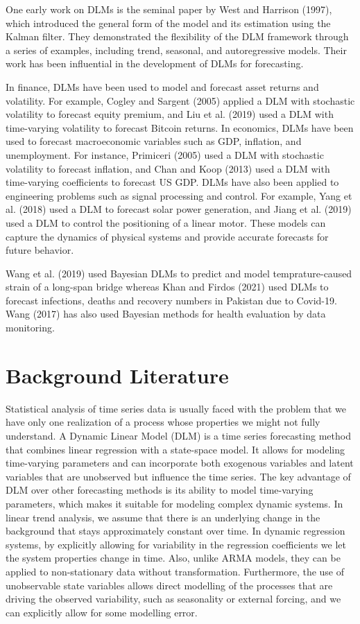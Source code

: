 \documentclass[a4paper,12pt]{article}
\begin{document}
One early work on DLMs is the seminal paper by West and Harrison (1997), which introduced the general form of the model and its estimation using the Kalman filter. They demonstrated the flexibility of the DLM framework through a series of examples, including trend, seasonal, and autoregressive models. Their work has been influential in the development of DLMs for forecasting.

In finance, DLMs have been used to model and forecast asset returns and volatility. For example, Cogley and Sargent (2005) applied a DLM with stochastic volatility to forecast equity premium, and Liu et al. (2019) used a DLM with time-varying volatility to forecast Bitcoin returns. In economics, DLMs have been used to forecast macroeconomic variables such as GDP, inflation, and unemployment. For instance, Primiceri (2005) used a DLM with stochastic volatility to forecast inflation, and Chan and Koop (2013) used a DLM with time-varying coefficients to forecast US GDP. DLMs have also been applied to engineering problems such as signal processing and control. For example, Yang et al. (2018) used a DLM to forecast solar power generation, and Jiang et al. (2019) used a DLM to control the positioning of a linear motor. These models can capture the dynamics of physical systems and provide accurate forecasts for future behavior.

Wang et al. (2019) used Bayesian DLMs to predict and model temprature-caused strain of a long-span bridge whereas Khan and Firdos (2021) used DLMs to forecast infections, deaths and recovery numbers in Pakistan due to Covid-19. Wang (2017) has also used Bayesian methods for health evaluation by data monitoring.
\pagebreak
\section{Background Literature}
\label{sec:org06f8061}
Statistical analysis of time series data is usually faced with the problem that we have only one realization of a process whose properties we might not fully understand. A Dynamic Linear Model (DLM) is a time series forecasting method that combines linear regression with a state-space model. It allows for modeling time-varying parameters and can incorporate both exogenous variables and latent variables that are unobserved but influence the time series. The key advantage of DLM over other forecasting methods is its ability to model time-varying parameters, which makes it suitable for modeling complex dynamic systems. In linear trend analysis, we assume that there is an underlying change in the background that stays approximately constant over time. In dynamic regression systems, by explicitly allowing for variability in the regression coefficients we let the system properties change in time. Also, unlike ARMA models, they can be applied to non-stationary data without transformation. Furthermore, the use of unobservable state variables allows direct modelling of the processes that are driving the observed variability, such as seasonality or external forcing, and we can explicitly allow for some modelling error.
\end{document}
